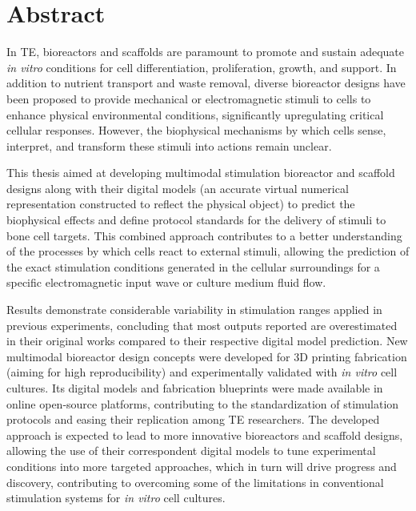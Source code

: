 \documentclass[12pt]{report}
\begin{document}
\newpage
\section*{Abstract}
{}
In \ac{TE}, bioreactors and scaffolds are paramount to promote and sustain adequate \textit{in vitro} conditions for cell differentiation, proliferation, growth, and support. In addition to nutrient transport and waste removal, diverse bioreactor designs have been proposed to provide mechanical or electromagnetic stimuli to cells to enhance physical environmental conditions, significantly upregulating critical cellular responses. However, the biophysical mechanisms by which cells sense, interpret, and transform these stimuli into actions remain unclear.

This thesis aimed at developing multimodal stimulation bioreactor and scaffold designs along with their digital models (an accurate virtual numerical representation constructed to reflect the physical object) to predict the biophysical effects and define protocol standards for the delivery of stimuli to bone cell targets. This combined approach contributes to a better understanding of the processes by which cells react to external stimuli, allowing the prediction of the exact stimulation conditions generated in the cellular surroundings for a specific electromagnetic input wave or culture medium fluid flow.

Results demonstrate considerable variability in stimulation ranges applied in previous experiments, concluding that most outputs reported are overestimated in their original works compared to their respective digital model prediction. New multimodal bioreactor design concepts were developed for \ac{3D} printing fabrication (aiming for high reproducibility) and experimentally validated with \textit{in vitro} cell cultures. Its digital models and fabrication blueprints were made available in online open-source platforms, contributing to the standardization of stimulation protocols and easing their replication among \ac{TE} researchers. The developed approach is expected to lead to more innovative bioreactors and scaffold designs, allowing the use of their correspondent digital models to tune experimental conditions into more targeted approaches, which in turn will drive progress and discovery, contributing to overcoming some of the limitations in conventional stimulation systems for \textit{in vitro} cell cultures. \newline
\end{document}
